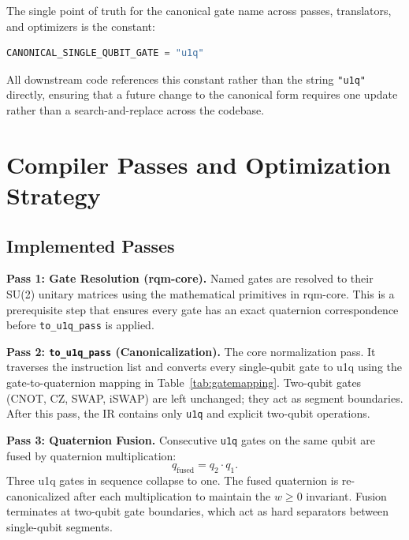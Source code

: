 \documentclass[conference]{IEEEtran}
\begin{document}
The single point of truth for the canonical gate name across passes, translators, and
optimizers is the constant:

\begin{lstlisting}[language=Python]
CANONICAL_SINGLE_QUBIT_GATE = "u1q"
\end{lstlisting}

All downstream code references this constant rather than the string \texttt{"u1q"} directly,
ensuring that a future change to the canonical form requires one update rather than a
search-and-replace across the codebase.

\section{Compiler Passes and Optimization Strategy}

\subsection{Implemented Passes}

\textbf{Pass 1: Gate Resolution (rqm-core).}
Named gates are resolved to their SU(2) unitary matrices using the mathematical primitives in
rqm-core. This is a prerequisite step that ensures every gate has an exact quaternion
correspondence before \texttt{to\_u1q\_pass} is applied.

\textbf{Pass 2: \texttt{to\_u1q\_pass} (Canonicalization).}
The core normalization pass. It traverses the instruction list and converts every single-qubit
gate to u1q using the gate-to-quaternion mapping in Table~\ref{tab:gatemapping}. Two-qubit
gates (CNOT, CZ, SWAP, iSWAP) are left unchanged; they act as segment boundaries. After this
pass, the IR contains only \texttt{u1q} and explicit two-qubit operations.

\textbf{Pass 3: Quaternion Fusion.}
Consecutive \texttt{u1q} gates on the same qubit are fused by quaternion multiplication:
\begin{equation}
q_{\text{fused}} = q_2 \cdot q_1.
\label{eq:fusion}
\end{equation}
Three u1q gates in sequence collapse to one. The fused quaternion is re-canonicalized after
each multiplication to maintain the $w \geq 0$ invariant. Fusion terminates at two-qubit gate
boundaries, which act as hard separators between single-qubit segments.
\end{document}
